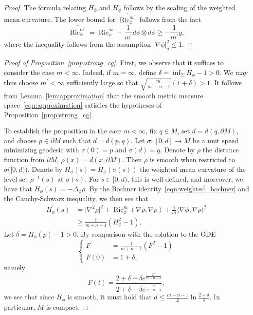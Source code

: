 \documentclass{amsart}
\theoremstyle{definition}
\theoremstyle{remark}
\numberwithin{equation}{section}
\begin{document}
\begin{proof}

The formula relating $\overline{H_\phi}$ and $H_\phi$ follows by the scaling of the weighted mean curvature.  The lower bound for $\overline{\operatorname{Ric}_\phi^{m^\prime}}$ follows from the fact
\[ \overline{\operatorname{Ric}_\phi^{m^\prime}} = \operatorname{Ric}_\phi^\infty - \frac{1}{m^\prime}d\phi\otimes d\phi \geq -\frac{1}{m^\prime}g, \]
where the inequality follows from the assumption ${\lvert}\nabla\phi{\rvert}_g^2\leq 1$.
\end{proof}

\begin{proof}[Proof of Proposition~\ref{prop:strong_cg}]

First, we observe that it suffices to consider the case $m<\infty$.  Indeed, if $m=\infty$, define $\delta=\inf_\Sigma H_\phi-1>0$.  We may thus choose $m^\prime<\infty$ sufficiently large so that $\sqrt{\frac{m^\prime}{m^\prime+n-1}}(1+\delta)>1$.  It follows from Lemma~\ref{lem:approximation} that the smooth metric measure space~\eqref{eqn:approximation} satisfies the hypotheses of Proposition~\ref{prop:strong_cg}.

To establish the proposition in the case $m<\infty$, fix $q\in M$, set $d=d(q,\partial M)$, and choose $p\in\partial M$ such that $d=d(p,q)$.  Let $\sigma\colon[0,d]\to M$ be a unit speed minimizing geodesic with $\sigma(0)=p$ and $\sigma(d)=q$.  Denote by $\rho$ the distance function from $\partial M$, $\rho(x)=d(x,\partial M)$.  Then $\rho$ is smooth when restricted to $\sigma\big([0,d)\big)$.  Denote by $H_\phi(s)=H_\phi(\sigma(s))$ the weighted mean curvature of the level set $\rho^{-1}(s)$ at $\sigma(s)$.  For $s\in[0,d)$, this is well-defined, and moreover, we have that $H_\phi(s)=-\Delta_\phi\rho$.  By the Bochner identity~\eqref{eqn:weighted_bochner} and the Cauchy-Schwarz inequality, we then see that
\begin{align*}
H_\phi^\prime(s) & = {\lvert}\nabla^2\rho{\rvert}^2 + \operatorname{Ric}_\phi^m(\nabla\rho,\nabla\rho) + \frac{1}{m}{\langle}\nabla\phi,\nabla\rho{\rangle}^2 \\
& \geq \frac{1}{m+n-1}\left(H_\phi^2 - 1\right) .
\end{align*}
Let $\delta=H_\phi(p)-1>0$.  By comparison with the solution to the ODE
\[ \begin{cases}
   F^\prime & = \frac{1}{m+n-1}\left(F^2-1\right) \\
   F(0) & = 1+\delta,
   \end{cases} \]
namely
\[ F(t) = \frac{2+\delta+\delta e^{\frac{2t}{m+n-1}}}{2+\delta-\delta e^{\frac{2t}{m+n-1}}} , \]
we see that since $H_\phi$ is smooth, it must hold that $d\leq\frac{m+n-1}{2}\ln\frac{2+\delta}{\delta}$.  In particular, $M$ is compact.
\end{proof}
\end{document}
